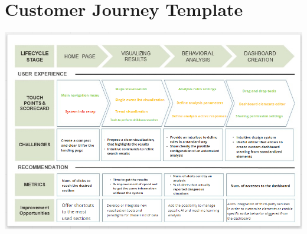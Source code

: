 \documentclass[../main.tex]{subfiles}
\begin{document}
    \section{Customer Journey Template}\label{sec:customer-journey-template}
    \includegraphics[scale = 0.8]{assets/customer_journey.png}
\end{document}
